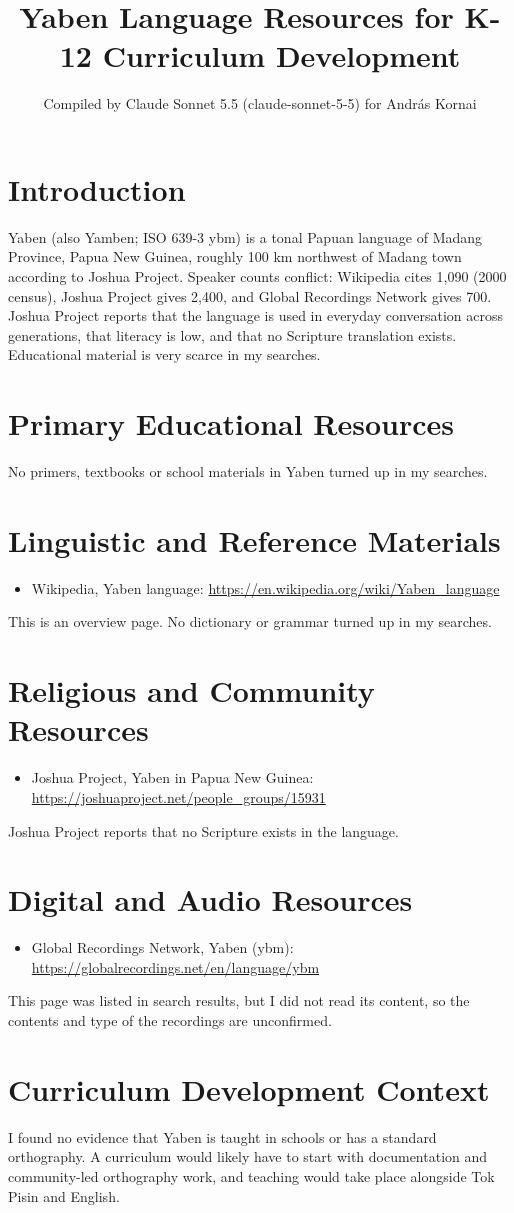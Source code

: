 \documentclass[12pt]{article}
\title{Yaben Language Resources for K-12 Curriculum Development}
\author{Compiled by Claude Sonnet 5.5 (claude-sonnet-5-5) for Andr\'as Kornai}
\date{}
\begin{document}
\maketitle

\section{Introduction}
Yaben (also Yamben; ISO 639-3 ybm) is a tonal Papuan language of Madang Province, Papua New Guinea, roughly 100 km northwest of Madang town according to Joshua Project. Speaker counts conflict: Wikipedia cites 1{,}090 (2000 census), Joshua Project gives 2{,}400, and Global Recordings Network gives 700. Joshua Project reports that the language is used in everyday conversation across generations, that literacy is low, and that no Scripture translation exists. Educational material is very scarce in my searches.

\section{Primary Educational Resources}
No primers, textbooks or school materials in Yaben turned up in my searches.

\section{Linguistic and Reference Materials}
\begin{itemize}
\item Wikipedia, Yaben language: \url{https://en.wikipedia.org/wiki/Yaben_language}
\end{itemize}
This is an overview page. No dictionary or grammar turned up in my searches.

\section{Religious and Community Resources}
\begin{itemize}
\item Joshua Project, Yaben in Papua New Guinea: \url{https://joshuaproject.net/people_groups/15931}
\end{itemize}
Joshua Project reports that no Scripture exists in the language.

\section{Digital and Audio Resources}
\begin{itemize}
\item Global Recordings Network, Yaben (ybm): \url{https://globalrecordings.net/en/language/ybm}
\end{itemize}
This page was listed in search results, but I did not read its content, so the contents and type of the recordings are unconfirmed.

\section{Curriculum Development Context}
I found no evidence that Yaben is taught in schools or has a standard orthography. A curriculum would likely have to start with documentation and community-led orthography work, and teaching would take place alongside Tok Pisin and English.
\end{document}
